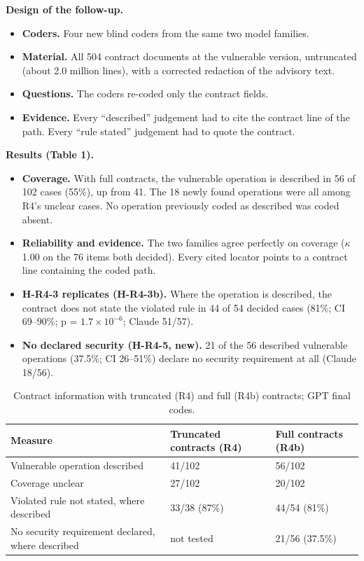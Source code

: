 \documentclass[conference]{IEEEtran}
\begin{document}
\textbf{Design of the follow-up.}
\begin{itemize}
\item \textbf{Coders.} Four new blind coders from the same two model families.
\item \textbf{Material.} All 504 contract documents at the vulnerable version, untruncated (about 2.0 million lines), with a corrected redaction of the advisory text.
\item \textbf{Questions.} The coders re-coded only the contract fields.
\item \textbf{Evidence.} Every ``described'' judgement had to cite the contract line of the path. Every ``rule stated'' judgement had to quote the contract.
\end{itemize}

\textbf{Results (Table 1).}
\begin{itemize}
\item \textbf{Coverage.} With full contracts, the vulnerable operation is described in 56 of 102 cases (55\%), up from 41. The 18 newly found operations were all among R4's unclear cases. No operation previously coded as described was coded absent.
\item \textbf{Reliability and evidence.} The two families agree perfectly on coverage ($\kappa$ 1.00 on the 76 items both decided). Every cited locator points to a contract line containing the coded path.
\item \textbf{H-R4-3 replicates (H-R4-3b).} Where the operation is described, the contract does not state the violated rule in 44 of 54 decided cases (81\%; CI 69--90\%; p = $1.7 \times 10^{-6}$; Claude 51/57).
\item \textbf{No declared security (H-R4-5, new).} 21 of the 56 described vulnerable operations (37.5\%; CI 26--51\%) declare no security requirement at all (Claude 18/56).
\end{itemize}

\begin{table}[t]
\caption{Contract information with truncated (R4) and full (R4b) contracts; GPT final codes.}
\footnotesize
\begin{tabularx}{\linewidth}{Xll}
\toprule
Measure & Truncated contracts (R4) & Full contracts (R4b) \\
\midrule
Vulnerable operation described & 41/102 & 56/102 \\
Coverage unclear & 27/102 & 20/102 \\
Violated rule not stated, where described & 33/38 (87\%) & 44/54 (81\%) \\
No security requirement declared, where described & not tested & 21/56 (37.5\%) \\
\bottomrule
\end{tabularx}
\end{table}
\end{document}
